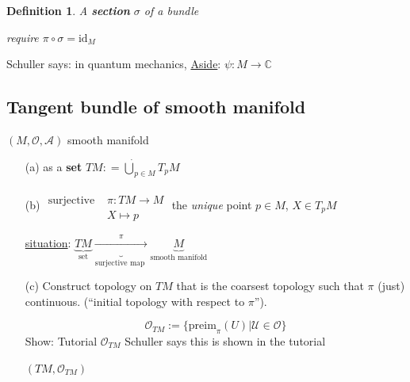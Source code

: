 \documentclass[10pt]{amsart}
\newtheorem{definition}{Definition}
\begin{document}
\begin{multicols*}{2}
	\begin{definition}
		A \textbf{section} $\sigma$ of a bundle
		
		
		
		
		
		
		require $\pi \circ \sigma = \text{id}_M$
	\end{definition}
	
	Schuller says: in quantum mechanics, 
	\underline{Aside}: $\psi : M \to \mathbb{C}$
	
	
	\subsection{Tangent bundle of smooth manifold}
	
	$(M,\mathcal{O},\mathcal{A})$ smooth manifold
	
	\begin{enumerate}
		\item[(a)] as a \textbf{set}
		$TM : = \dot{\bigcup}_{p\in M} T_pM$
		\item[(b)] $\begin{aligned} & \quad \\
		\text{surjective } & \pi: TM \to M \\
		& X\mapsto p \end{aligned}$ the \emph{unique} point $p\in M$, $X \in T_pM$  
		
		\underline{situation}:  $\underbrace{TM}_{\text{set}} \underbrace{ \xrightarrow{ \pi } }_{\text{surjective map }} \underbrace{M}_{\text{smooth manifold}}$
		
		\item[(c)] Construct topology on $TM$ that is the coarsest topology such that $\pi$ (just) continuous.  (``initial topology with respect to $\pi$'').
		
		\[
		\mathcal{O}_{TM} := \lbrace \text{preim}_{\pi}(U) | \mathcal{U}\in \mathcal{O} \rbrace
		\]
		Show: Tutorial $\mathcal{O}_{TM}$
		Schuller says this is shown in the tutorial
		
		$(TM,\mathcal{O}_{TM})$  \\
		

\end{enumerate}
\end{multicols*}
\end{document}
